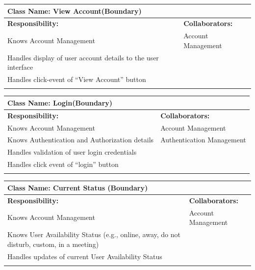 \documentclass[]{article}
\begin{document}
	\begin{table}[ht]
		\centering
		\begin{tabular}{|p{7cm}|p{7cm}|}
		\hline 
		 \multicolumn{2}{|l|}{\textbf{Class Name:} View Account(Boundary)} \\
		\hline
		\textbf{Responsibility:} & \textbf{Collaborators:} \\
		\hline
			Knows Account Management & Account Management \\
			Handles display of user account details to the user interface &\\
			Handles click-event of “View Account” button &\\
		\vspace{0.1in} & \\
		\hline
		\end{tabular}
	\end{table}

	\begin{table}[ht]
		\centering
		\begin{tabular}{|p{7cm}|p{7cm}|}
		\hline 
		 \multicolumn{2}{|l|}{\textbf{Class Name:} Login(Boundary)} \\
		\hline
		\textbf{Responsibility:} & \textbf{Collaborators:} \\
		\hline
			Knows Account Management & Account Management\\
			Knows Authentication and Authorization details & Authentication Management\\
			Handles validation of user login credentials &\\
			Handles click event of “login” button &\\
		\vspace{0.1in} & \\
		\hline
		\end{tabular}
	\end{table}

	\begin{table}[ht]
		\centering
		\begin{tabular}{|p{7cm}|p{7cm}|}
		\hline 
		 \multicolumn{2}{|l|}{\textbf{Class Name:} Current Status (Boundary)} \\
		\hline
		\textbf{Responsibility:} & \textbf{Collaborators:} \\
		\hline
			Knows Account Management & Account Management \\
			Knows User Availability Status (e.g., online, away, do not disturb, custom, in a meeting) &\\
			Handles updates of current User Availability Status &\\
		\vspace{0.1in} & \\
		\hline
		\end{tabular}
	\end{table}
\end{document}
